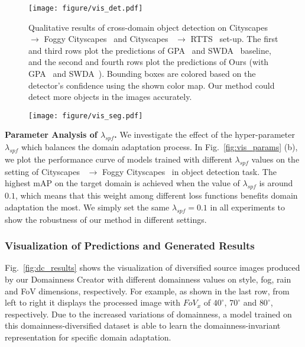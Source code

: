 \documentclass[10pt,journal,compsoc]{IEEEtran}
\begin{document}
\begin{figure*}[htbp]
\centering
\texttt{[image: figure/vis\_det.pdf]}
\caption{
Qualitative results of cross-domain object detection on Cityscapes~\cite{cordts2016cityscapes} $\rightarrow$ Foggy Cityscapes~\cite{FoggyCity} and Cityscapes~\cite{cordts2016cityscapes} $\rightarrow$ RTTS~\cite{RTTS} set-up. The first and third rows plot the predictions of GPA~\cite{GPA} and SWDA~\cite{SWDA} baseline, and the second and fourth rows plot the predictions of Ours (with GPA~\cite{GPA} and SWDA~\cite{SWDA}). Bounding boxes are colored based on the detector's confidence using the shown color map. 
Our method could detect more objects in the images accurately.
}
\label{fig:c2f_det}
\vspace{-1mm}
\end{figure*}

 \begin{figure*}[t!]{
\centering
    \texttt{[image: figure/vis\_seg.pdf]}
\label{fig:v2c_kitti}}
\vspace{-3mm}
\end{figure*}






\noindent \textbf{Parameter Analysis of $\lambda_{spf}$.}  
We investigate the effect of the hyper-parameter $\lambda_{spf}$ which balances the domain adaptation process. 
In Fig.~\ref{fig:vis_params} (b), we plot the performance curve of models trained with different $\lambda_{spf}$ values on the setting of Cityscapes~\cite{cordts2016cityscapes} $\rightarrow$ Foggy Cityscapes~\cite{FoggyCity} in object detection task.  
The highest mAP on the target domain is
achieved when the value of  $\lambda_{spf}$  is around $0.1$, which means that this weight among
different loss functions benefits domain adaptation the most. 
We simply set the same $\lambda_{spf}=0.1$ in all experiments to show the robustness of our method in different settings.  

\subsubsection{Visualization of Predictions and Generated Results}
\label{sec:visualization}
Fig.~\ref{fig:dc_results} shows the visualization of diversified source images produced by our Domainness Creator with different domainness values on style, fog, rain and FoV dimensions, respectively. For example, as shown in the last row, from left to right it displays the processed image with $FoV_{x}$ of $40^{\circ}$,  $70^{\circ}$ and $80^{\circ}$, respectively. Due to the increased variations of domainness, a model  trained on this domainness-diversified dataset is able to learn the domainness-invariant representation for specific domain adaptation. 
 
\end{document}
